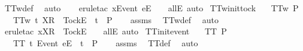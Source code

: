 \ TT{}w{\isacharunderscore}def\ \isamarkupfalse%
\ {\isacharparenleft}auto{\isacharparenright}\isanewline
\ \ \isamarkupfalse%
\ {\isacharparenleft}erule{\isacharunderscore}tac\ x{\isacharequal}{\isachardoublequoteopen}{\isacharbrackleft}Event\ e{\isacharbrackright}\isactrlsub E\ {\isacharhash}\ {\isasymrho}{\isachardoublequoteclose}\ \ allE{\isacharcomma}\ auto{\isacharparenright}%
\endisatagproof
{\isafoldproof}%
%
\isadelimproof
\isanewline
%
\endisadelimproof
\isanewline
{}\isamarkupfalse%
\ TT{}w{\isacharunderscore}init{\isacharunderscore}tock{\isacharcolon}\isanewline
\ \ \ {\isachardoublequoteopen}TT{}w\ P{\isachardoublequoteclose}\isanewline
\ \ \ {\isachardoublequoteopen}TT{}w\ {\isacharbraceleft}t{\isachardot}\ {\isacharbrackleft}X{\isacharbrackright}\isactrlsub R\ {\isacharhash}\ {\isacharbrackleft}Tock{\isacharbrackright}\isactrlsub E\ {\isacharhash}\ t\ {\isasymin}\ P{\isacharbraceright}{\isachardoublequoteclose}\isanewline
%
\isadelimproof
\ \ %
\endisadelimproof
%
\isatagproof
{}\isamarkupfalse%
\ assms\ \isamarkupfalse%
\ TT{}w{\isacharunderscore}def\ \isamarkupfalse%
\ {\isacharparenleft}auto{\isacharparenright}\isanewline
\ \ \isamarkupfalse%
\ {\isacharparenleft}erule{\isacharunderscore}tac\ x{\isacharequal}{\isachardoublequoteopen}{\isacharbrackleft}X{\isacharbrackright}\isactrlsub R\ {\isacharhash}\ {\isacharbrackleft}Tock{\isacharbrackright}\isactrlsub E\ {\isacharhash}\ {\isasymrho}{\isachardoublequoteclose}\ \ allE{\isacharcomma}\ auto{\isacharparenright}%
\endisatagproof
{\isafoldproof}%
%
\isadelimproof
\isanewline
%
\endisadelimproof
\isanewline
{}\isamarkupfalse%
\ TT{}{\isacharunderscore}init{\isacharunderscore}event{\isacharcolon}\isanewline
\ \ \ {\isachardoublequoteopen}TT{}\ P{\isachardoublequoteclose}\isanewline
\ \ \ {\isachardoublequoteopen}TT{}\ {\isacharbraceleft}t{\isachardot}\ {\isacharbrackleft}Event\ e{\isacharbrackright}\isactrlsub E\ {\isacharhash}\ t\ {\isasymin}\ P{\isacharbraceright}{\isachardoublequoteclose}\isanewline
%
\isadelimproof
\ \ %
\endisadelimproof
%
\isatagproof
{}\isamarkupfalse%
\ assms\ \isamarkupfalse%
\ TT{}{\isacharunderscore}def\ \isamarkupfalse%
\ {\isacharparenleft}auto{\isacharparenright}\isanewline
